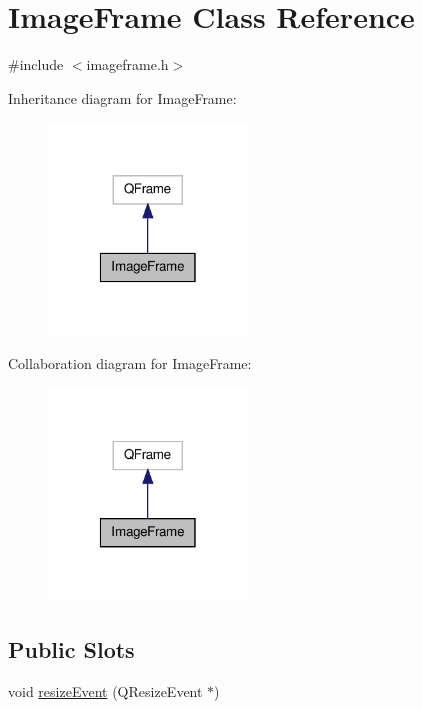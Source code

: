 \hypertarget{classImageFrame}{\section{Image\-Frame Class Reference}
\label{classImageFrame}
}


{\ttfamily \#include $<$imageframe.\-h$>$}



Inheritance diagram for Image\-Frame\-:\nopagebreak
\begin{figure}[H]
\begin{center}
\leavevmode
\includegraphics[width=150pt]{classImageFrame__inherit__graph}
\end{center}
\end{figure}


Collaboration diagram for Image\-Frame\-:\nopagebreak
\begin{figure}[H]
\begin{center}
\leavevmode
\includegraphics[width=150pt]{classImageFrame__coll__graph}
\end{center}
\end{figure}
\subsection*{Public Slots}
\begin{DoxyCompactItemize}
\item 
void \hyperlink{classImageFrame_a03c4a3c033846294a43a2a87eb0b5f30}{resize\-Event} (Q\-Resize\-Event $\ast$)
\end{DoxyCompactItemize}
